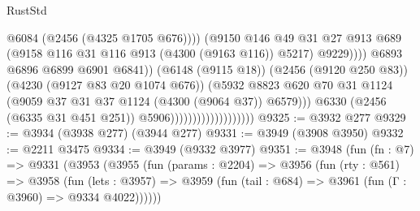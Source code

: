 \begin{lexlean}{RustStd}
\begin{coremodule}
                                                          @6084
                                                          (@2456 (@4325 @1705 @676))))
                                                      (@9150
                                                        @146
                                                        @49
                                                        @31
                                                        @27
                                                        @913
                                                        @689
                                                        (@9158
                                                          @116
                                                          @31
                                                          @116
                                                          @913
                                                          (@4300 (@9163 @116))
                                                          @5217)
                                                        @9229))))
                                                @6893
                                                @6896
                                                @6899
                                                @6901
                                                @6841))
                                            (@6148 (@9115 @18))
                                            (@2456 (@9120 @250 @83))
                                            (@4230 (@9127 @83 @20 @1074 @676))
                                            (@5932
                                              @8823
                                              @620
                                              @70
                                              @31
                                              @1124
                                              (@9059 @37 @31 @37 @1124 (@4300 (@9064 @37)) @6579)))
                                          @6330
                                          (@2456 (@6335 @31 @451 @251))
                                          @5906)))))))))))))))))))
@9325 := @3932 @277
@9329 := @3934 (@3938 @277) (@3944 @277)
@9331 := @3949 (@3908 @3950)
@9332 := @2211 @3475
@9334 := @3949 (@9332 @3977)
@9351 := @3948
    (fun (fn : @7) =>
    @9331
      (@3953
        (@3955
          (fun (params : @2204) =>
          @3956
            (fun (rty : @561) =>
            @3958
              (fun (lets : @3957) =>
              @3959 (fun (tail : @684) => @3961 (fun (Γ : @3960) => @9334 @4022))))))

\end{coremodule}
\end{lexlean}
